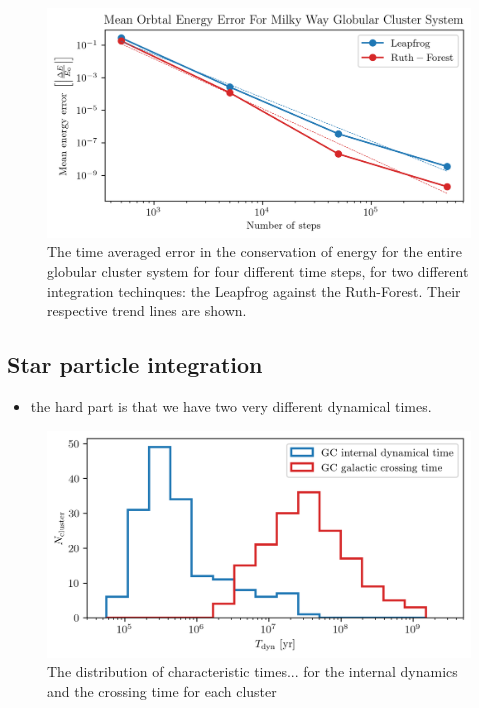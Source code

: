         \begin{figure}
            \centering
            \includegraphics[width=\linewidth]{images/numericalErrorMeanEnergyErrorRuthForestLeapFrog.png}
            \caption{The time averaged error in the conservation of energy for the entire globular cluster system for four different time steps, for two different integration techinques: the Leapfrog against the Ruth-Forest. Their respective trend lines are shown.}
            \label{fig:numericalErrorMeanEnergyErrorRuthForestLeapFrog}
        \end{figure}

    \subsection{Star particle integration}

        \begin{itemize}
            \item the hard part is that we have two very different dynamical times.
        \end{itemize}

        \begin{figure}
            \centering
            \includegraphics[width=\linewidth]{images/GCsystemCharacteristicTimes.png}
            \caption{The distribution of characteristic times... for the internal dynamics and the crossing time for each cluster}
            \label{fig:GCsystemCharacteristicTimes}
        \end{figure}


